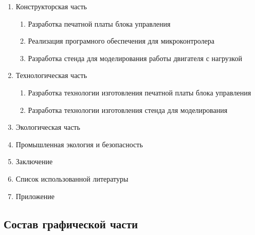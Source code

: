 \begin{enumerate}
\begin{enumerate}
        \end{enumerate}
    \item Конструкторская часть
        \begin{enumerate}
            \item Разработка печатной платы блока управления
            \item Реализация програмного обеспечения для микроконтролера
            \item Разработка стенда для моделирования работы двигателя с нагрузкой
        \end{enumerate}
    \item{Технологическая часть}
        \begin{enumerate}
            \item Разработка технологии изготовления печатной платы блока управления
            \item Разработка технологии изготовления стенда для моделирования
        \end{enumerate}
    \item{Экологическая часть}
    \item{Промышленная экология и безопасность}
    \item{Заключение}
    \item{Список использованной литературы}
    \item{Приложение}
\end{enumerate}

\newpage
\subsection{Состав графической части}

